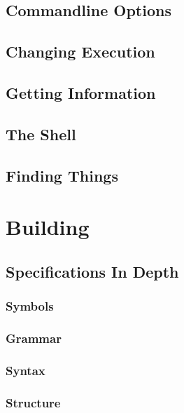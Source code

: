 \section{Commandline Options}


\section{Changing Execution}


\section{Getting Information}


\section{The Shell}


\section{Finding Things}



\chapter{Building}
\label{chapter:Building}



\section{Specifications In Depth}


\subsection{Symbols}


\subsection{Grammar}


\subsection{Syntax}


\subsection{Structure}


